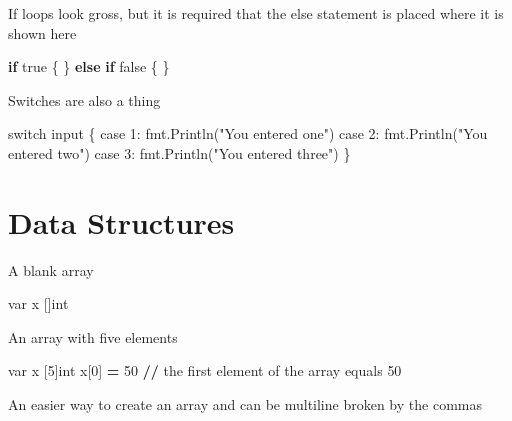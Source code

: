 \documentclass[]{book}
\newenvironment{Shaded}{\begin{snugshade}}{\end{snugshade}}
\newcommand{\BuiltInTok}[1]{#1}
\newcommand{\ControlFlowTok}[1]{\textcolor[rgb]{0.13,0.29,0.53}{\textbf{#1}}}
\newcommand{\DecValTok}[1]{\textcolor[rgb]{0.00,0.00,0.81}{#1}}
\newcommand{\NormalTok}[1]{#1}
\newcommand{\OperatorTok}[1]{\textcolor[rgb]{0.81,0.36,0.00}{\textbf{#1}}}
\newcommand{\StringTok}[1]{\textcolor[rgb]{0.31,0.60,0.02}{#1}}
\begin{document}
If loops look gross, but it is required that the else statement is placed where it is shown here

\begin{Shaded}
\begin{Highlighting}[]
\ControlFlowTok{if}\NormalTok{ true \{}
\NormalTok{\} }\ControlFlowTok{else} \ControlFlowTok{if}\NormalTok{ false \{}
\NormalTok{\}}
\end{Highlighting}
\end{Shaded}

Switches are also a thing

\begin{Shaded}
\begin{Highlighting}[]
\NormalTok{switch }\BuiltInTok{input}\NormalTok{ \{                          }
\NormalTok{    case }\DecValTok{1}\NormalTok{: fmt.Println(}\StringTok{"You entered one"}\NormalTok{)  }
\NormalTok{    case }\DecValTok{2}\NormalTok{: fmt.Println(}\StringTok{"You entered two"}\NormalTok{)  }
\NormalTok{    case }\DecValTok{3}\NormalTok{: fmt.Println(}\StringTok{"You entered three"}\NormalTok{)}
\NormalTok{\}                                           }
\end{Highlighting}
\end{Shaded}

\hypertarget{data-structures}{%
\section{Data Structures}\label{data-structures}}

A blank array

\begin{Shaded}
\begin{Highlighting}[]
\NormalTok{var x []}\BuiltInTok{int}
\end{Highlighting}
\end{Shaded}

An array with five elements

\begin{Shaded}
\begin{Highlighting}[]
\NormalTok{var x [}\DecValTok{5}\NormalTok{]}\BuiltInTok{int}
\NormalTok{x[}\DecValTok{0}\NormalTok{] }\OperatorTok{=} \DecValTok{50} \OperatorTok{//}\NormalTok{ the first element of the array equals }\DecValTok{50}
\end{Highlighting}
\end{Shaded}

An easier way to create an array and can be multiline broken by the commas
\end{document}
